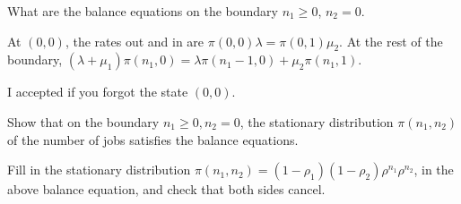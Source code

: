 \begin{exercise}[201804]
  What are the balance equations on the boundary $n_1\geq 0$, $n_2=0$. 
\begin{solution}
    At $(0,0)$, the rates out and in are $\pi(0,0)\lambda = \pi(0,1)\mu_2$. At the rest of the boundary, $(\lambda+\mu_1) \pi(n_1, 0) = \lambda \pi(n_1-1, 0) + \mu_2\pi(n_1, 1)$. 

I accepted if you forgot the state $(0,0)$. 
\end{solution}
\end{exercise}

\begin{exercise}[201804]
Show that on the boundary $n_1\geq0, n_2=0$, the stationary distribution $\pi(n_1, n_2)$  of the number of jobs satisfies the balance equations.
\begin{solution}
  Fill in the stationary distribution  $\pi(n_1,n_2)=(1-\rho_1)(1-\rho_2)\rho^{n_1}\rho^{n_2}$, in the above balance equation, and check that both sides cancel. 
\end{solution}
\end{exercise}


\begin{comment}

The solution is in the formula sheet!

  \begin{center}
\begin{tikzpicture}[scale=1,
    >=stealth',
    circ/.style={
      circle, 
      draw=black,
      thick,
      minimum size=1.cm,
      inner sep=0pt,
      text centered
    },
    pil/.style={
           ->,
           thick,
           shorten <=2pt,
           shorten >=2pt}
]

\node[circ] (0) {$(0,0)$};
\node[circ, right=of 0] (1) {$(1,0)$}
edge[pil, <-]  node[midway, above] {$\lambda$} (0); 
\node[circ, above=of 0] (2) {$(0,1)$}
edge[pil, <-]  node[midway, above] {$\mu_1$} (1)
edge[pil, ->]  node[midway, left] {$\mu_2$} (0);
\end{tikzpicture}
    
  \end{center}
\end{comment}



